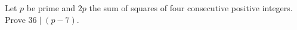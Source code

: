 Let $p$ be prime and $2p$ the sum of squares of four consecutive positive integers. Prove $36\mid(p-7)$.
